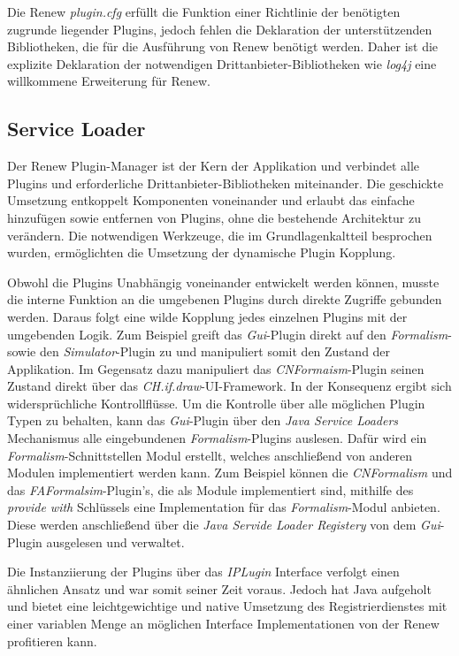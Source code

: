 	Die Renew \textit{plugin.cfg} erfüllt die Funktion einer Richtlinie der benötigten zugrunde liegender Plugins, jedoch fehlen die Deklaration der unterstützenden Bibliotheken, die für die Ausführung von Renew benötigt werden. Daher ist die explizite Deklaration der notwendigen Drittanbieter-Bibliotheken wie \textit{log4j} eine willkommene Erweiterung für Renew. 

\subsection{Service Loader} 
	Der Renew Plugin-Manager ist der Kern der Applikation und verbindet alle Plugins und erforderliche Drittanbieter-Bibliotheken miteinander. Die geschickte Umsetzung entkoppelt Komponenten voneinander und erlaubt das einfache hinzufügen sowie entfernen von Plugins, ohne die bestehende Architektur zu verändern. Die notwendigen Werkzeuge, die im Grundlagenkaltteil besprochen wurden, ermöglichten die Umsetzung der dynamische Plugin Kopplung. \bigbreak

	Obwohl die Plugins Unabhängig voneinander entwickelt werden können, musste die interne Funktion an die umgebenen Plugins durch direkte Zugriffe gebunden werden. Daraus folgt eine wilde Kopplung jedes einzelnen Plugins mit der umgebenden Logik. Zum Beispiel greift das \textit{Gui}-Plugin direkt auf den \textit{Formalism}- sowie den \textit{Simulator}-Plugin zu und manipuliert somit den Zustand der Applikation. Im Gegensatz dazu manipuliert das \textit{CNFormaism}-Plugin seinen Zustand direkt über das \textit{CH.if.draw}-UI-Framework. In der Konsequenz ergibt sich widersprüchliche Kontrollflüsse.\newline  
	Um die Kontrolle über alle möglichen Plugin Typen zu behalten, kann das \textit{Gui}-Plugin über den \textit{Java Service Loaders} Mechanismus alle eingebundenen \textit{Formalism}-Plugins auslesen. Dafür wird ein \textit{Formalism}-Schnittstellen Modul erstellt, welches anschließend von anderen Modulen implementiert werden kann. Zum Beispiel können die \textit{CNFormalism} und das \textit{FAFormalsim}-Plugin's, die als Module implementiert sind, mithilfe des \textit{provide with} Schlüssels eine Implementation für das \textit{Formalism}-Modul anbieten. Diese werden anschließend über die \textit{Java Servide Loader Registery} von dem \textit{Gui}-Plugin ausgelesen und verwaltet. \bigbreak

	Die Instanziierung der Plugins über das \textit{IPLugin} Interface verfolgt einen ähnlichen Ansatz und war somit seiner Zeit voraus. Jedoch hat Java aufgeholt und bietet eine leichtgewichtige und native Umsetzung des Registrierdienstes mit einer variablen Menge an möglichen Interface Implementationen von der Renew profitieren kann.   

